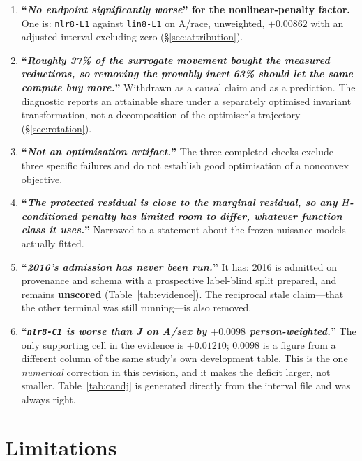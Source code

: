 \documentclass[10pt]{article}
\begin{document}
\begin{enumerate}
\item \textbf{``\emph{No endpoint significantly worse}'' for the nonlinear-penalty factor.} One is:
\texttt{nlr8-L1} against \texttt{lin8-L1} on A/race, unweighted, $+0.00862$ with an adjusted interval
excluding zero (\S\ref{sec:attribution}).
\item \textbf{``\emph{Roughly 37\% of the surrogate movement bought the measured reductions, so
removing the provably inert 63\% should let the same compute buy more.}''} Withdrawn as a causal
claim and as a prediction. The diagnostic reports an attainable share under a separately optimised
invariant transformation, not a decomposition of the optimiser's trajectory
(\S\ref{sec:rotation}).
\item \textbf{``\emph{Not an optimisation artifact.}''} The three completed checks exclude three
specific failures and do not establish good optimisation of a nonconvex objective.
\item \textbf{``\emph{The protected residual is close to the marginal residual, so any
$H$-conditioned penalty has limited room to differ, whatever function class it uses.}''} Narrowed
to a statement about the frozen nuisance models actually fitted.
\item \textbf{``\emph{2016's admission has never been run.}''} It has: 2016 is admitted on
provenance and schema with a prospective label-blind split prepared, and remains \textbf{unscored}
(Table~\ref{tab:evidence}). The reciprocal stale claim---that the other terminal was still
running---is also removed.
\item \textbf{``\emph{\texttt{nlr8-C1} is worse than J on A/sex by $+0.0098$ person-weighted.}''}
The only supporting cell in the evidence is $+0.01210$; $0.0098$ is a figure from a different
column of the same study's own development table. This is the one \emph{numerical} correction in
this revision, and it makes the deficit larger, not smaller. Table~\ref{tab:candj} is generated
directly from the interval file and was always right.
\end{enumerate}

\section{Limitations}
\label{sec:limitations}
\end{document}
